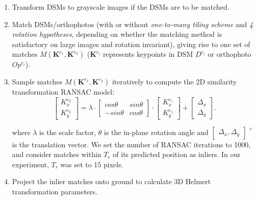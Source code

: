 \begin{enumerate}
    \item Transform DSMs to grayscale images if the DSMs are to be matched.
    \item Match DSMs/orthophotos (with or without \textit{one-to-many tiling scheme} and \textit{4 rotation hypotheses}, depending on whether the matching method is satisfactory on large images and rotation invariant), giving rise to one set of matches $M({\mathbf{K}^{e_1},\mathbf{K}^{e_2}})$ ($\mathbf{K}^{e_i}$ represents keypoints in DSM $D^{e_i}$ or orthophoto $Op^{e_i}$).
    \item Sample matches $M({\mathbf{K}^{e_1},\mathbf{K}^{e_2}})$ iteratively to compute the 2D similarity transformation RANSAC model:
\begin{equation}
\left [ \begin{array}{c}
{K}_x^{e_2}\\
{K}_y^{e_2}
\end{array}
\right ] =\lambda \cdot { \left[ \begin{array}{cc}
    cos\theta & sin\theta\\
    -sin\theta & cos\theta
    \end{array} 
    \right ]} \cdot {\left [ \begin{array}{c}
    {K}_x^{e_1}\\
    {K}_y^{e_1}
    \end{array}
    \right ]} + \left [ \begin{array}{c}
\Delta_x\\
\Delta_y
\end{array}
\right ]. \label{eq:2DSim}
\end{equation}

    where $\lambda$ is the scale factor, $\theta$ is the in-plane rotation angle and $\left [ \begin{array}{c}
    \Delta_x, \Delta_y
    \end{array}
    \right ]$ $^{^T}$ is the translation vector.
    We set the number of RANSAC iterations to 1000, and consider matches within $T_r$ of its predicted position as inliers. In our experiment, {$T_r$ was set to 15 pixels.}
    \item Project the inlier matches onto ground to calculate 3D Helmert transformation parameters.
\end{enumerate}




